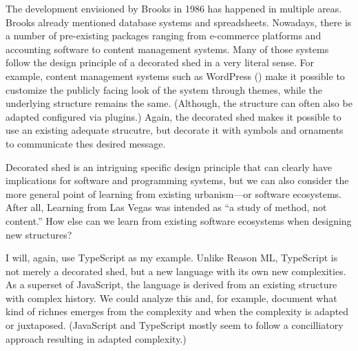 The development envisioned by Brooks in 1986 has happened in multiple areas. Brooks already
mentioned database systems and spreadsheets. Nowadays, there is a number of pre-existing packages
ranging from e-commerce platforms and accounting software to content management systems.
Many of those systems follow the design principle of a decorated shed in a very literal sense.
For example, content management systems such as WordPress () make it
possible to customize the publicly facing look of the system through themes, while the underlying
structure remains the same. (Although, the structure can often also be adapted configured via
plugins.) Again, the decorated shed makes it possible to use an existing adequate strucutre,
but decorate it with symbols and ornaments to communicate thes desired message.


Decorated shed is an intriguing specific design principle that can clearly have implications
for software and programming systems, but we can also consider the more general point
of learning from existing urbanism---or software ecosystems. After all, Learning from Las Vegas
was intended as ``a study of method, not content.''
How else can we learn from existing software ecosystems when designing new structures?

I will, again, use TypeScript as my example. Unlike Reason ML, TypeScript is not merely a decorated
shed, but a new language with its own new complexities. As a superset of JavaScript, the language is
derived from an existing structure with complex history. We could analyze this and, for example,
document what kind of richnes emerges from the complexity and when the complexity is adapted or
juxtaposed. (JavaScript and TypeScript mostly seem to follow a concilliatory approach resulting in
adapted complexity.)

